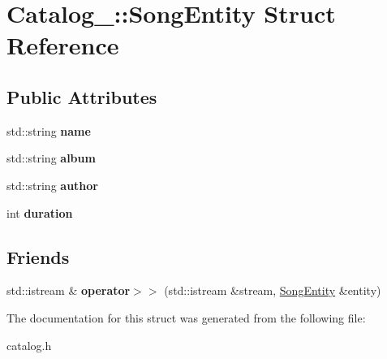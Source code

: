 \hypertarget{struct_catalog___1_1_song_entity}{}\section{Catalog\+\_\+\+:\+:Song\+Entity Struct Reference}
\label{struct_catalog___1_1_song_entity}
\subsection*{Public Attributes}
\begin{DoxyCompactItemize}
\item 
std\+::string {\bfseries name}\hypertarget{struct_catalog___1_1_song_entity_a37663964ded7eeeb3509b662979ccd14}{}\label{struct_catalog___1_1_song_entity_a37663964ded7eeeb3509b662979ccd14}

\item 
std\+::string {\bfseries album}\hypertarget{struct_catalog___1_1_song_entity_a65909708e08707a2fc3b3aa95ef4c2dd}{}\label{struct_catalog___1_1_song_entity_a65909708e08707a2fc3b3aa95ef4c2dd}

\item 
std\+::string {\bfseries author}\hypertarget{struct_catalog___1_1_song_entity_a7e7b2bd61852f0f1eed33ac066271e7a}{}\label{struct_catalog___1_1_song_entity_a7e7b2bd61852f0f1eed33ac066271e7a}

\item 
int {\bfseries duration}\hypertarget{struct_catalog___1_1_song_entity_a3e4c02e257540b6ba7c064b6b05aac5a}{}\label{struct_catalog___1_1_song_entity_a3e4c02e257540b6ba7c064b6b05aac5a}

\end{DoxyCompactItemize}
\subsection*{Friends}
\begin{DoxyCompactItemize}
\item 
std\+::istream \& {\bfseries operator$>$$>$} (std\+::istream \&stream, \hyperlink{struct_catalog___1_1_song_entity}{Song\+Entity} \&entity)\hypertarget{struct_catalog___1_1_song_entity_ae082a65fcb118db86a76b5bc171cf01f}{}\label{struct_catalog___1_1_song_entity_ae082a65fcb118db86a76b5bc171cf01f}

\end{DoxyCompactItemize}


The documentation for this struct was generated from the following file\+:\begin{DoxyCompactItemize}
\item 
catalog.\+h\end{DoxyCompactItemize}
